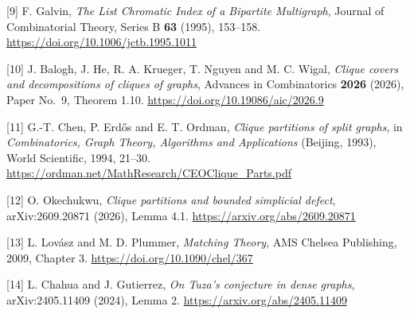 \documentclass[english,11pt,a4paper]{article}
\begin{document}
{[}9{]} F. Galvin, \emph{The List Chromatic Index of a Bipartite Multigraph}, Journal of Combinatorial Theory, Series B \textbf{63} (1995), 153--158. \url{https://doi.org/10.1006/jctb.1995.1011}

{[}10{]} J. Balogh, J. He, R. A. Krueger, T. Nguyen and M. C. Wigal, \emph{Clique covers and decompositions of cliques of graphs}, Advances in Combinatorics \textbf{2026} (2026), Paper No.~9, Theorem 1.10. \url{https://doi.org/10.19086/aic/2026.9}

{[}11{]} G.-T. Chen, P. Erdős and E. T. Ordman, \emph{Clique partitions of split graphs}, in \emph{Combinatorics, Graph Theory, Algorithms and Applications} (Beijing, 1993), World Scientific, 1994, 21--30. \url{https://ordman.net/MathResearch/CEOClique_Parts.pdf}

{[}12{]} O. Okechukwu, \emph{Clique partitions and bounded simplicial defect}, arXiv:2609.20871 (2026), Lemma 4.1. \url{https://arxiv.org/abs/2609.20871}

{[}13{]} L. Lovász and M. D. Plummer, \emph{Matching Theory}, AMS Chelsea Publishing, 2009, Chapter 3. \url{https://doi.org/10.1090/chel/367}

{[}14{]} L. Chahua and J. Gutierrez, \emph{On Tuza's conjecture in dense graphs}, arXiv:2405.11409 (2024), Lemma 2. \url{https://arxiv.org/abs/2405.11409}
\end{document}
